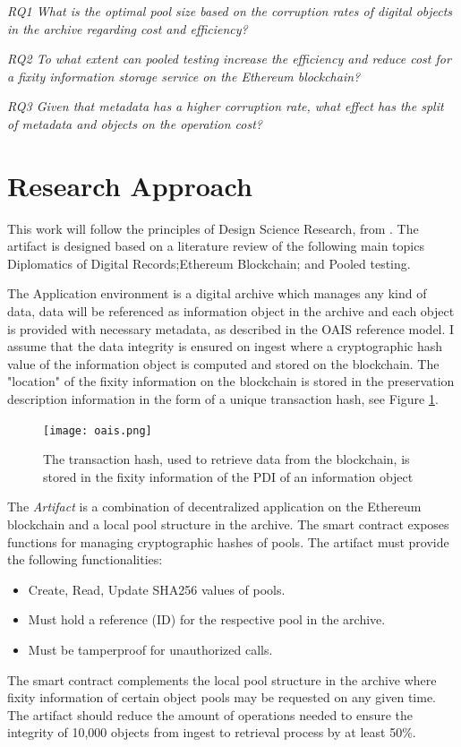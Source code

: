 \textit{RQ1 What is the optimal pool size based on the corruption rates of digital objects in the archive regarding cost and efficiency?}

\textit{RQ2 To what extent can pooled testing increase the efficiency and reduce cost for a fixity information storage service on the Ethereum blockchain?}

\textit{RQ3 Given that metadata has a higher corruption rate, what effect has the split of metadata and objects on the operation cost?}

\section{Research Approach}
\label{sec:approach}
This work will follow the principles of Design Science Research, from \cite{hevner2007three}. The artifact is designed based on a literature review of the following main topics Diplomatics of Digital Records;Ethereum Blockchain; and Pooled testing.

The Application environment is a digital archive which manages any kind of data, data will be referenced as information object in the archive and each object is provided with necessary metadata, as described in the OAIS reference model. I assume that the data integrity is ensured on ingest where a cryptographic hash value of the information object is computed and stored on the blockchain. The "location" of the fixity information on the blockchain is stored in the preservation description information in the form of a unique transaction hash, see Figure \ref{fig:oais-fixity}. 

\begin{figure}[h]
  \caption{The transaction hash, used to retrieve data from the blockchain, is stored in the fixity information of the PDI of an information object \cite[7]{lee2010open}}
  \label{fig:oais-fixity}
  \centering
    \texttt{[image: oais.png]}
\end{figure}

The \textit{Artifact} is a combination of decentralized application on the Ethereum blockchain and a local pool structure in the archive. The smart contract exposes functions for managing cryptographic hashes of pools.
The artifact must provide the following functionalities:
\begin{itemize}
  \item Create, Read, Update SHA256 values of pools.
  \item Must hold a reference (ID) for the respective pool in the archive.
  \item Must be tamperproof for unauthorized calls.
\end{itemize}
The smart contract complements the local pool structure in the archive where fixity information of certain object pools may be requested on any given time. The artifact should reduce the amount of operations needed to ensure the integrity of 10,000 objects from ingest to retrieval process by at least 50\%.